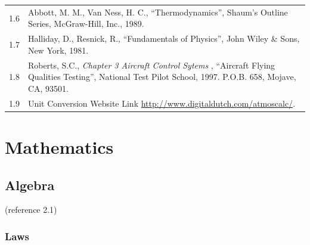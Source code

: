 \documentclass[
]{book}
\begin{document}
\begin{longtable}[]{@{}ll@{}}
\begin{minipage}[t]{0.06\columnwidth}\raggedright
1.6\strut
\end{minipage} & \begin{minipage}[t]{0.88\columnwidth}\raggedright
Abbott, M. M., Van Ness, H. C., ``Thermodynamics'', Shaum's Outline Series, McGraw-Hill, Inc., 1989.\strut
\end{minipage}\tabularnewline
\begin{minipage}[t]{0.06\columnwidth}\raggedright
1.7\strut
\end{minipage} & \begin{minipage}[t]{0.88\columnwidth}\raggedright
Halliday, D., Resnick, R., ``Fundamentals of Physics'', John Wiley \& Sons, New York, 1981.\strut
\end{minipage}\tabularnewline
\begin{minipage}[t]{0.06\columnwidth}\raggedright
1.8\strut
\end{minipage} & \begin{minipage}[t]{0.88\columnwidth}\raggedright
Roberts, S.C., \emph{Chapter 3 Aircraft Control Sytems} , ``Aircraft Flying Qualities Testing'', National Test Pilot School, 1997. P.O.B. 658, Mojave, CA, 93501.\strut
\end{minipage}\tabularnewline
\begin{minipage}[t]{0.06\columnwidth}\raggedright
1.9\strut
\end{minipage} & \begin{minipage}[t]{0.88\columnwidth}\raggedright
Unit Conversion Website Link \url{http://www.digitaldutch.com/atmoscalc/}.\strut
\end{minipage}\tabularnewline
\bottomrule
\end{longtable}

\hypertarget{mathematics}{%
\chapter{Mathematics}\label{mathematics}}

\hypertarget{algebra}{%
\section{Algebra}\label{algebra}}

(reference 2.1)

\hypertarget{laws}{%
\subsection{Laws}\label{laws}}
\end{document}
